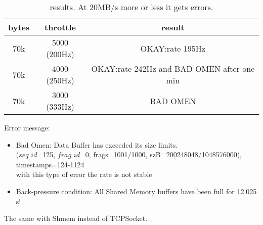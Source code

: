 \documentclass{article}
\begin{document}
\begin{center}  
\begin{table}[!h]
\centering
\begin{tabular}{c c c}
\hline
bytes & throttle &  result\\
\hline
70k & 5000 (200Hz) & OKAY:rate 195Hz  \\
70k & 4000 (250Hz) & OKAY:rate 242Hz and BAD OMEN after one min  \\
70k & 3000 (333Hz) & BAD OMEN  \\

\end{tabular}
\caption{ results. At 20MB/s more or less it gets errors.}
\end{table}\label{tab:upperlimits}
\end{center}


Error message: 
\begin{itemize}
    \item Bad Omen: Data Buffer has exceeded its size limits.
    \\
    ($seq\_id$=125, $frag\_id$=0, frags=1001/1000, szB=200248048/1048576000), timestamps=124-1124
    \\
    with this type of error the rate is not stable
    \item Back-pressure condition: All Shared Memory buffers have been full for 12.025 s!
\end{itemize}

The same with Shmem instead of TCPSocket.
\end{document}

